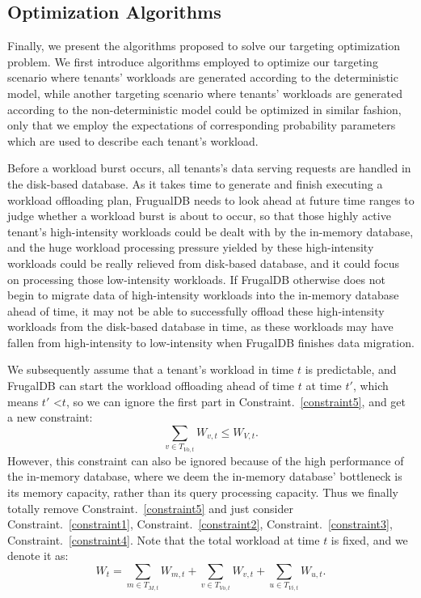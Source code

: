 \subsection{Optimization Algorithms}\label{sec:Optimization-Algorithms}

Finally, we present the algorithms proposed to solve our targeting optimization problem. We first introduce algorithms employed to optimize our targeting scenario where tenants' workloads are generated according to the deterministic model, while another targeting scenario where tenants' workloads are generated according to the non-deterministic model could be optimized in similar fashion, only that we employ the expectations of corresponding probability parameters which are used to describe each tenant's workload.

Before a workload burst occurs, all tenants's data serving requests are handled in the disk-based database. As it takes time to generate and finish executing a workload offloading plan, FrugualDB needs to look ahead at future time ranges to judge whether a workload burst is about to occur, so that those highly active tenant's high-intensity workloads could be dealt with by the in-memory database, and the huge workload processing pressure yielded by these high-intensity workloads could be really relieved from disk-based database, and it could focus on processing those low-intensity workloads. If FrugalDB otherwise does not begin to migrate data of high-intensity workloads into the in-memory database ahead of time, it may not be able to successfully offload these high-intensity workloads from the disk-based database in time, as these workloads may have fallen from high-intensity to low-intensity when FrugalDB finishes data migration.

We subsequently assume that a tenant's workload in time $t$ is predictable, and FrugalDB can start the workload offloading ahead of time $t$ at time $t'$, which means $t'$ \textless $t$,
so we can ignore the first part in Constraint.~\ref{constraint5}, and get a new constraint:
\begin{equation}\label{constraint8}
    \sum_{v \in T_{Vo, t}}{W_{v, t}} \leq W_{V, t}.
\end{equation}
However, this constraint can also be ignored because of the high performance of the in-memory database, where we deem the in-memory database' bottleneck is its memory capacity, rather than its query processing capacity. Thus we finally totally remove Constraint.~\ref{constraint5} and just consider Constraint.~\ref{constraint1}, Constraint.~\ref{constraint2}, Constraint.~\ref{constraint3}, Constraint.~\ref{constraint4}. Note that the total workload at time $t$ is fixed, and we denote it as:
\begin{equation}\label{constraint10}
   W_t=\sum_{m \in T_{M, t}}{W_{m, t}} +\sum_{v \in T_{Vo, t}}{W_{v, t}}+\sum_{u \in T_{Vi, t}}{W_{u, t}}.
\end{equation}

